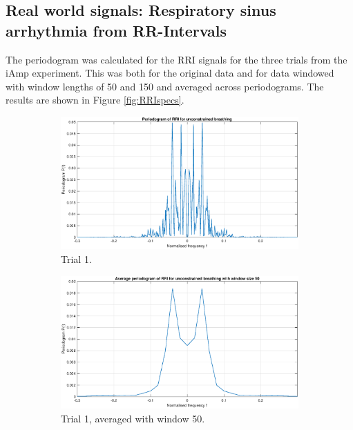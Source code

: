 \subsection{Real world signals: Respiratory sinus arrhythmia from RR-Intervals}

The periodogram was calculated for the RRI signals for the three trials from the iAmp experiment. This was both for the original data and for data windowed with window lengths of 50 and 150 and averaged across periodograms. The results are shown in Figure \ref{fig:RRIspecs}.

\begin{figure}[H]
\begin{subfigure}{.32\textwidth}
  \centering
  \includegraphics[width=\linewidth]{assignment3figs/new_pgm_uncon_noave.eps}  
  \caption{Trial 1.}
\end{subfigure}
\begin{subfigure}{.32\textwidth}
  \centering
  \includegraphics[width=\linewidth]{assignment3figs/new_pgm_uncon_ave50.eps}  
  \caption{Trial 1, averaged with window 50.}
\end{subfigure}
\begin{subfigure}{.32\textwidth}

\end{subfigure}
\end{figure}
